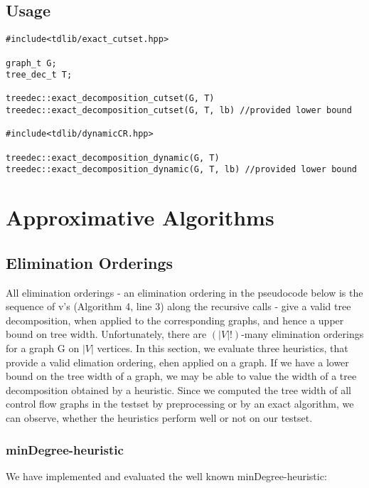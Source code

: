 \documentclass[a4wide]{article}
\begin{document}
\subsection{Usage}

\begin{lstlisting}[mathescape]
#include<tdlib/exact_cutset.hpp>

graph_t G;
tree_dec_t T;

treedec::exact_decomposition_cutset(G, T)
treedec::exact_decomposition_cutset(G, T, lb) //provided lower bound

#include<tdlib/dynamicCR.hpp>

treedec::exact_decomposition_dynamic(G, T)
treedec::exact_decomposition_dynamic(G, T, lb) //provided lower bound
\end{lstlisting}

\newpage

\section{Approximative Algorithms}

\subsection{Elimination Orderings}

All elimination orderings - an elimination ordering in the pseudocode below is the sequence of v's (Algorithm 4, line 3) along the recursive calls - give a valid tree decomposition, when applied to the corresponding graphs, and hence a upper bound on tree width. Unfortunately, there are $(|V|!)$-many elimination orderings for a graph G on $|V|$ vertices. In this section, we evaluate three heuristics, that provide a valid elimation ordering, ehen applied on a graph. If we have a lower bound on the tree width of a graph, we may be able to value the width of a tree decomposition obtained by a heuristic. Since we computed the tree width of all control flow graphs in the testset by preprocessing or by an exact algorithm, we can observe, whether the heuristics perform well or not on our testset. 

\subsubsection{minDegree-heuristic}

We have implemented and evaluated the well known minDegree-heuristic: \\
\end{document}
